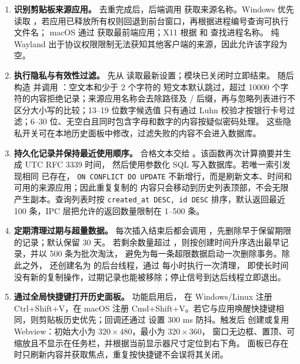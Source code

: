 \documentclass[12pt,a4paper]{ctexart}
\begin{document}
\begin{sloppypar}
\begin{enumerate}[label=(\arabic*)]
  \item \textbf{识别剪贴板来源应用。}
    去重完成后，后端调用  获取来源名称。Windows 优先读取
    ，若应用已释放所有权则回退到前台窗口，再根据进程编号查询可执行文件名；
    macOS 通过  获取最前端应用；X11 根据
     和  查找进程名称。
    纯 Wayland 出于协议权限限制无法获知其他客户端的来源，因此允许该字段为空。

  \item \textbf{执行隐私与有效性过滤。}
     先从  读取最新设置；模块已关闭时立即结束。
    随后构造  并调用 ：空文本和少于 2 个字符的
    短文本默认跳过，超过 10000 个字符的内容拒绝记录；来源应用名称会去除路径及
    / 后缀，再与忽略列表进行不区分大小写的比较；13--19 位数字候选值
    只有通过 Luhn 校验才按银行卡号过滤；6--30 位、无空白且同时包含字母和数字的内容按疑似密码处理。
    这些隐私开关可在本地历史面板中修改，过滤失败的内容不会进入数据库。

  \item \textbf{持久化记录并保持最近使用顺序。}
    合格文本交给 。该函数再次计算摘要并生成 UTC RFC 3339 时间，
    然后使用参数化 SQL 写入数据库。若唯一索引发现相同  已存在，
    \texttt{ON CONFLICT DO UPDATE} 不新增行，而是刷新文本、时间和可用的来源应用；因此重复复制的
    内容只会移动到历史列表顶部，不会无限产生副本。查询列表时按 \texttt{created\_at DESC, id DESC}
    排序，默认返回最近 100 条，IPC 层把允许的返回数量限制在 1--500 条。

  \item \textbf{定期清理过期与超量数据。}
    每次插入结束后都会调用 ，先删除早于保留期限的记录；默认保留 30 天。
    若剩余数量超过 ，则按创建时间升序选出最早记录，并以 500 条为批次淘汰，
    避免为每一条超限数据启动一次删除事务。除此之外， 还创建名为
     的后台线程，通过  每小时执行一次清理，
    即使长时间没有新的复制操作，过期记录也能被移除；停止信号到达后线程立即退出。

  \item \textbf{通过全局快捷键打开历史面板。}
    功能启用后， 在 Windows/Linux 注册 Ctrl+Shift+V，在 macOS 注册
    Cmd+Shift+V。若它与应用唤醒快捷键相同，则剪贴板历史优先；回调还通过
     设置 300 ms 防抖。触发后  创建或复用
     Webview：初始大小为 $320\times480$，最小为 $320\times360$，
    窗口无边框、置顶、可缩放且不显示在任务栏，并根据当前显示器尺寸定位到右下角。
    面板已存在时只刷新内容并获取焦点，重复按快捷键不会误将其关闭。


\end{enumerate}
\end{sloppypar}
\end{document}
